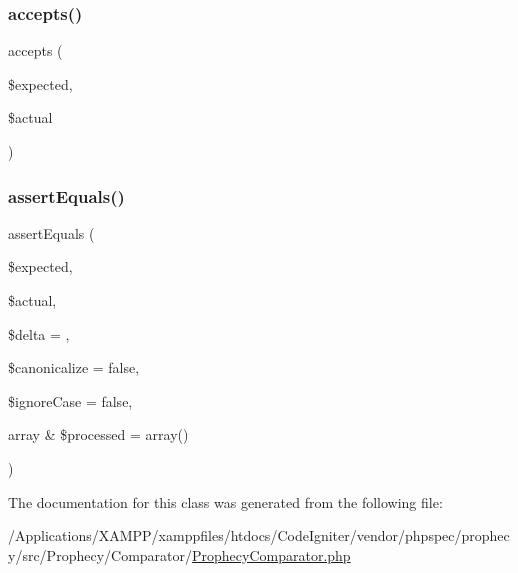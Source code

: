 \subsubsection{\texorpdfstring{accepts()}{accepts()}}
{\footnotesize\ttfamily accepts (\begin{DoxyParamCaption}\item[{}]{\$expected,  }\item[{}]{\$actual }\end{DoxyParamCaption})}

\mbox{\label{class_prophecy_1_1_comparator_1_1_prophecy_comparator_a85a7369896910cf1d55e31d477c29f1e}} 
\subsubsection{\texorpdfstring{assert\+Equals()}{assertEquals()}}
{\footnotesize\ttfamily assert\+Equals (\begin{DoxyParamCaption}\item[{}]{\$expected,  }\item[{}]{\$actual,  }\item[{}]{\$delta = {},  }\item[{}]{\$canonicalize = {\ttfamily false},  }\item[{}]{\$ignore\+Case = {\ttfamily false},  }\item[{array \&}]{\$processed = {\ttfamily array()} }\end{DoxyParamCaption})}



The documentation for this class was generated from the following file\+:\begin{DoxyCompactItemize}
\item 
/\+Applications/\+X\+A\+M\+P\+P/xamppfiles/htdocs/\+Code\+Igniter/vendor/phpspec/prophecy/src/\+Prophecy/\+Comparator/\mbox{\hyperlink{_prophecy_comparator_8php}{Prophecy\+Comparator.\+php}}\end{DoxyCompactItemize}
